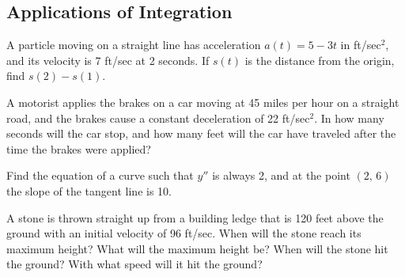 \documentclass[addpoints, 12pt]{exam}
\begin{document}
\subsection*{Applications of Integration}
\begin{questions}
    \setcounter{question}{4}
    \question A particle moving on a straight line has acceleration $a(t)=5-3t$ in ft/sec$^2$, and its velocity is 7 ft/sec at 2 seconds. If $s(t)$ is the distance from the origin, find $s(2)-s(1)$.
    
    
    \newpage
    
    \question A motorist applies the brakes on a car moving at 45 miles per hour on a straight road, and the brakes cause a constant deceleration of 22 ft/sec$^2$. In how many seconds will the car stop, and how many feet will the car have traveled after the time the brakes were applied?
    
    \question Find the equation of a curve such that $y''$ is always 2, and at the point $(2,\,6)$ the slope of the tangent line is 10.
    
    \question A stone is thrown straight up from a building ledge that is 120 feet above the ground with an initial velocity of 96 ft/sec. When will the stone reach its maximum height? What will the maximum height be? When will the stone hit the ground? With what speed will it hit the ground?
    
    
\end{questions}


\newpage
{}
\end{document}
